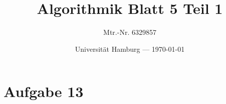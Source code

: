 \documentclass[parskip=half,a4paper]{scrartcl}
\title{Algorithmik Blatt 5 Teil 1}
\author{Mtr.-Nr. 6329857}
\date{Universität Hamburg --- \today}
\begin{document}
\maketitle %

\linenumbers

\section*{Aufgabe 13}
\end{document}
